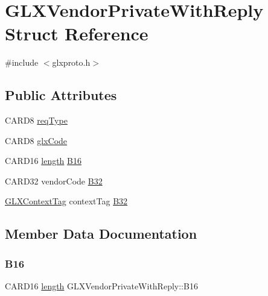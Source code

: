 \hypertarget{struct_g_l_x_vendor_private_with_reply}{}\section{G\+L\+X\+Vendor\+Private\+With\+Reply Struct Reference}
\label{struct_g_l_x_vendor_private_with_reply}


{\ttfamily \#include $<$glxproto.\+h$>$}

\subsection*{Public Attributes}
\begin{DoxyCompactItemize}
\item 
C\+A\+R\+D8 \hyperlink{struct_g_l_x_vendor_private_with_reply_a4a6828bcec3869bc2bfe08dfebc3722d}{req\+Type}
\item 
C\+A\+R\+D8 \hyperlink{struct_g_l_x_vendor_private_with_reply_aae11e79966b4522a98091f87a43edf1a}{glx\+Code}
\item 
C\+A\+R\+D16 \hyperlink{glcorearb_8h_ab9c919755bde3b34349e23a32b4e0fa7}{length} \hyperlink{struct_g_l_x_vendor_private_with_reply_a287e9692dc20e0cacc1f936117414a50}{B16}
\item 
C\+A\+R\+D32 vendor\+Code \hyperlink{struct_g_l_x_vendor_private_with_reply_adf03e9c976fa41fee21ee920563dd224}{B32}
\item 
\hyperlink{glxproto_8h_ae71763ce00c9fa460beb4699af678691}{G\+L\+X\+Context\+Tag} context\+Tag \hyperlink{struct_g_l_x_vendor_private_with_reply_a5390cf212a203c00e742f2ad0bdf1b0b}{B32}
\end{DoxyCompactItemize}


\subsection{Member Data Documentation}
\mbox{\label{struct_g_l_x_vendor_private_with_reply_a287e9692dc20e0cacc1f936117414a50}} 
\subsubsection{\texorpdfstring{B16}{B16}}
{\footnotesize\ttfamily C\+A\+R\+D16 \hyperlink{glcorearb_8h_ab9c919755bde3b34349e23a32b4e0fa7}{length} G\+L\+X\+Vendor\+Private\+With\+Reply\+::\+B16}

